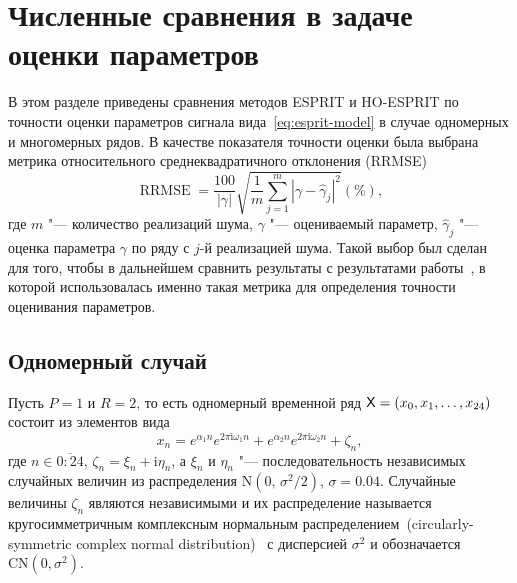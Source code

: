 \documentclass[specialist,
  substylefile=spbu_report.rtx,
subf,href,colorlinks=true, 12pt]{disser}
\theoremstyle{plain}
\theoremstyle{definition}
\theoremstyle{remark}
\newcommand{\iu}{\mathrm{i}}
\begin{document}
\section{Численные сравнения в задаче оценки параметров}\label{sec:esprit-comparison}
В этом разделе приведены сравнения методов ESPRIT и HO-ESPRIT по точности оценки параметров сигнала
вида~\eqref{eq:esprit-model} в случае одномерных и многомерных рядов.
В качестве показателя точности оценки была выбрана метрика относительного среднеквадратичного
отклонения (RRMSE)
\begin{equation}
  \label{eq:rrmse}
  \operatorname{RRMSE} = \frac{100}{|\gamma|}\sqrt{\frac{1}{m} \sum_{j=1}^{m} \left|\gamma-\widehat{\gamma}_j\right|^2} (\%),
\end{equation}
где $m$ "--- количество реализаций шума, $\gamma$ "--- оцениваемый параметр, $\widehat{\gamma}_j$ "---
оценка параметра $\gamma$ по ряду с $j$-й реализацией шума.
Такой выбор был сделан для того, чтобы в дальнейшем сравнить результаты с результатами
работы~\cite{hosvd-hooi-separation}, в которой использовалась именно такая метрика для определения
точности оценивания параметров.

\subsection{Одномерный случай}\label{subsec:esprit-comparison}
Пусть $P=1$ и $R=2$, то есть одномерный временной ряд $\mathsf{X} = \left(x_0, x_1, \ldots, x_{24}\right)$
состоит из элементов вида
\begin{equation}\label{eq:esprit-1d-series}
  x_n = e^{ \alpha_1 n }
  e^{2 \pi\iu \omega_1 n} +
  e^{ \alpha_2 n }
  e^{ 2 \pi \iu \omega_2 n} + \zeta_n,
\end{equation}
где $n \in \overline{0:24}$, $\zeta_n = \xi_n + \iu \eta_n$, а
$\xi_n$ и $\eta_n$ "--- последовательность независимых случайных величин из
распределения $\mathrm{N}(0,\, \sigma^2 / 2)$, $\sigma=0.04$.
Случайные величины $\zeta_n$ являются независимыми и их
распределение называется кругосимметричным комплексным нормальным
распределением~(circularly-symmetric complex normal
distribution)~\cite{ComplexNormal} с дисперсией
$\sigma^2$ и обозначается
$\mathrm{CN}(0, \sigma^2)$.
\end{document}
